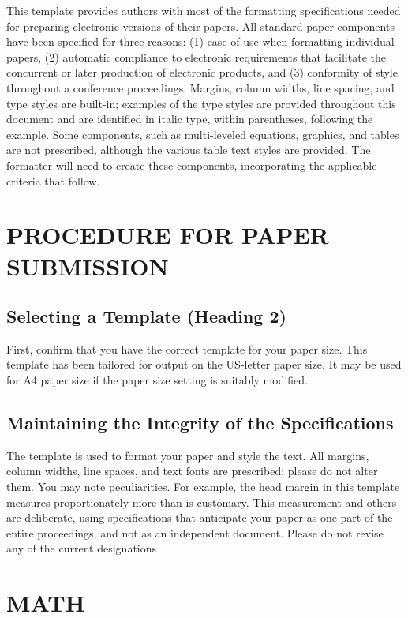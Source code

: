 \documentclass[letterpaper, 10 pt, conference]{ieeeconf}  %
\begin{document}
This template provides authors with most of the formatting specifications needed for preparing electronic versions of their papers. All standard paper components have been specified for three reasons: (1) ease of use when formatting individual papers, (2) automatic compliance to electronic requirements that facilitate the concurrent or later production of electronic products, and (3) conformity of style throughout a conference proceedings. Margins, column widths, line spacing, and type styles are built-in; examples of the type styles are provided throughout this document and are identified in italic type, within parentheses, following the example. Some components, such as multi-leveled equations, graphics, and tables are not prescribed, although the various table text styles are provided. The formatter will need to create these components, incorporating the applicable criteria that follow.

\section{PROCEDURE FOR PAPER SUBMISSION}

\subsection{Selecting a Template (Heading 2)}

First, confirm that you have the correct template for your paper size. This template has been tailored for output on the US-letter paper size. 
It may be used for A4 paper size if the paper size setting is suitably modified.

\subsection{Maintaining the Integrity of the Specifications}

The template is used to format your paper and style the text. All margins, column widths, line spaces, and text fonts are prescribed; please do not alter them. You may note peculiarities. For example, the head margin in this template measures proportionately more than is customary. This measurement and others are deliberate, using specifications that anticipate your paper as one part of the entire proceedings, and not as an independent document. Please do not revise any of the current designations

\section{MATH}\label{sec:math}
\end{document}
